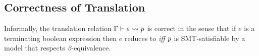 
\subsection{Correctness of Translation}

Informally, the translation relation $ \Gamma\vdash e \rightsquigarrow p $
is correct in the sense that if $e$ is a terminating boolean expression
then $e$ reduces to \etrue \textit{iff} $p$ is SMT-satisfiable
by a model that respects $\beta$-equivalence.

